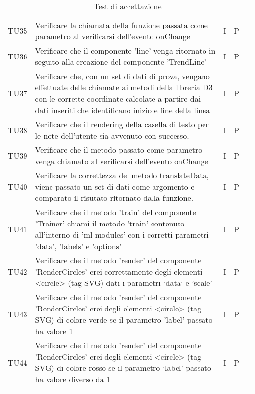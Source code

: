 \begin{longtable} {
		>{}p{15mm} 
		>{}p{79.5mm}
		>{}p{15mm} 
		>{}p{15mm}
		>{}p{0mm}}
	TU35	& Verificare la chiamata della funzione passata come parametro al verificarsi dell'evento onChange & I & P &\TBstrut \\ [2mm]
	TU36	& Verificare che il componente 'line' venga ritornato in seguito alla creazione del componente 'TrendLine' & I & P &\TBstrut \\ [2mm]
	TU37	& Verificare che, con un set di dati di prova, vengano effettuate delle chiamate ai metodi della libreria D3 con le corrette coordinate calcolate a partire dai dati inseriti che identificano inizio e fine della linea & I & P &\TBstrut \\ [2mm]
	TU38	& Verificare che il rendering della casella di testo per le note dell'utente sia avvenuto con successo. & I & P &\TBstrut \\ [2mm]
	TU39	& Verificare che il metodo passato come parametro venga chiamato al verificarsi dell'evento onChange & I & P &\TBstrut \\ [2mm]
	TU40	& Verificare la correttezza del metodo translateData, viene passato un set di dati come argomento e comparato il risutato ritornato dalla funzione. & I & P &\TBstrut \\ [2mm]
	TU41	& Verificare che il metodo 'train' del componente 'Trainer' chiami il metodo 'train' contenuto all'interno di 'ml-modules' con i corretti parametri 'data', 'labels' e 'options' & I & P &\TBstrut \\ [2mm]
	TU42	& Verificare che il metodo 'render' del componente 'RenderCircles' crei correttamente degli elementi <circle> (tag SVG) dati i parametri 'data' e 'scale' & I & P &\TBstrut \\ [2mm]
	TU43	& Verificare che il metodo 'render' del componente 'RenderCircles' crei degli elementi <circle> (tag SVG) di colore verde se il parametro 'label' passato ha valore 1 & I & P &\TBstrut \\ [2mm]
	TU44	& Verificare che il metodo 'render' del componente 'RenderCircles' crei degli elementi <circle> (tag SVG) di colore rosso se il parametro 'label' passato ha valore diverso da 1 & I & P &\TBstrut \\ [2mm]
	\rowcolor{white}
	\caption{Test di accettazione}
\end{longtable}
